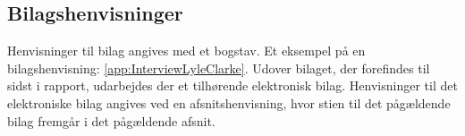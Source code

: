 \subsection*{Bilagshenvisninger}
Henvisninger til bilag angives med et bogstav. Et eksempel på en bilagshenvisning: \autoref{app:InterviewLyleClarke}. Udover bilaget, der forefindes til sidst i rapport, udarbejdes der et tilhørende elektronisk bilag. Henvisninger til det elektroniske bilag angives ved en afsnitshenvisning, hvor stien til det pågældende bilag fremgår i det pågældende afsnit. 
%
%
